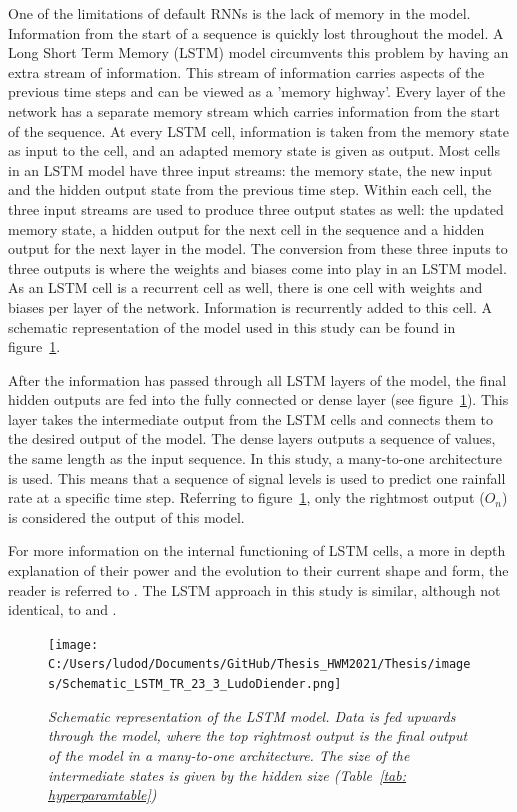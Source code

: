 \documentclass[twocolumn, 10pt, a4paper]{memoir}
\begin{document}
	One of the limitations of default RNNs is the lack of memory in the model. Information from the start of a sequence is quickly lost throughout the model. A Long Short Term Memory (LSTM) model circumvents this problem by having an extra stream of information. This stream of information carries aspects of the previous time steps and can be viewed as a 'memory highway'. Every layer of the network has a separate memory stream which carries information from the start of the sequence. At every LSTM cell, information is taken from the memory state as input to the cell, and an adapted memory state is given as output. Most cells in an LSTM model have three input streams: the memory state, the new input and the hidden output state from the previous time step. Within each cell, the three input streams are used to produce three output states as well: the updated memory state, a hidden output for the next cell in the sequence and a hidden output for the next layer in the model. The conversion from these three inputs to three outputs is where the weights and biases come into play in an LSTM model. As an LSTM cell is a recurrent cell as well, there is one cell with weights and biases per layer of the network. Information is recurrently added to this cell. A schematic representation of the model used in this study can be found in figure~\ref{fig: multilayer RNN}.
	
	After the information has passed through all LSTM layers of the model, the final hidden outputs are fed into the fully connected or dense layer (see figure~\ref{fig: multilayer RNN}). This layer takes the intermediate output from the LSTM cells and connects them to the desired output of the model. The dense layers outputs a sequence of values, the same length as the input sequence. In this study, a many-to-one architecture is used. This means that a sequence of signal levels is used to predict one rainfall rate at a specific time step. Referring to figure~\ref{fig: multilayer RNN}, only the rightmost output ($O_n$) is considered the output of this model.
	
	For more information on the internal functioning of LSTM cells, a more in depth explanation of their power and the evolution to their current shape and form, the reader is referred to .
	The LSTM approach in this study is similar, although not identical, to  and . 
	
	\begin{figure}
		\center
		\texttt{[image: C:/Users/ludod/Documents/GitHub/Thesis\_HWM2021/Thesis/images/Schematic\_LSTM\_TR\_23\_3\_LudoDiender.png]}
		\caption{\textit{Schematic representation of the LSTM model. Data is fed upwards through the model, where the top rightmost output is the final output of the model in a many-to-one architecture. The size of the intermediate states is given by the hidden size (Table~\ref{tab: hyperparamtable}) }}
		\label{fig: multilayer RNN}
	\end{figure}
	
\end{document}
